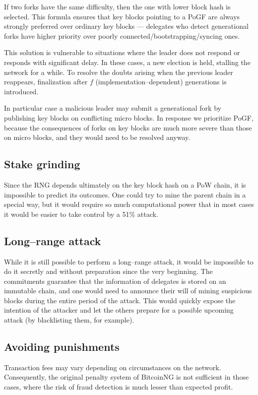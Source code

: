 If two forks have the same difficulty, then the one with lower block hash
is selected. This formula ensures that key blocks pointing to a PoGF are always
strongly preferred over ordinary key blocks — delegates who detect generational
forks have higher priority over poorly connected/bootstrapping/syncing ones.

This solution is vulnerable to situations where the leader does not respond
or responds with significant delay. In these cases, a new election is held,
stalling the network for a while. To resolve the doubts arising when the
previous leader reappears,
finalization after $f$ (implementation–dependent) generations is introduced.

In particular case a malicious leader may submit a generational
fork by publishing key blocks on conflicting micro blocks.
In response we prioritize PoGF, because the consequences of forks on
key blocks are much more severe than those on micro blocks, and they would need to
be resolved anyway.

\subsection{Stake grinding}

Since the RNG depends ultimately on the key block hash on a PoW chain, it is
impossible to predict its outcomes. One could try to mine the parent chain
in a special way, but it would require so much computational power that in
most cases it would be easier to take control by a 51\% attack.

\subsection{Long–range attack}
While it is still possible to perform a long–range attack, it would be impossible to do it
secretly and without preparation since the very beginning. The commitments
guarantee that the information of delegates is stored on an immutable chain,
and one would need to announce their will of mining suspicious blocks during
the entire period of the attack. This would quickly expose the intention of the attacker
and let the others prepare for a possible upcoming attack
(by blacklisting them, for example).

\subsection{Avoiding punishments}
Transaction fees may vary depending on circumstances on the network.
Consequently, the original penalty system of BitcoinNG is not sufficient in
those cases, where the risk of fraud detection is much lesser than expected profit.

